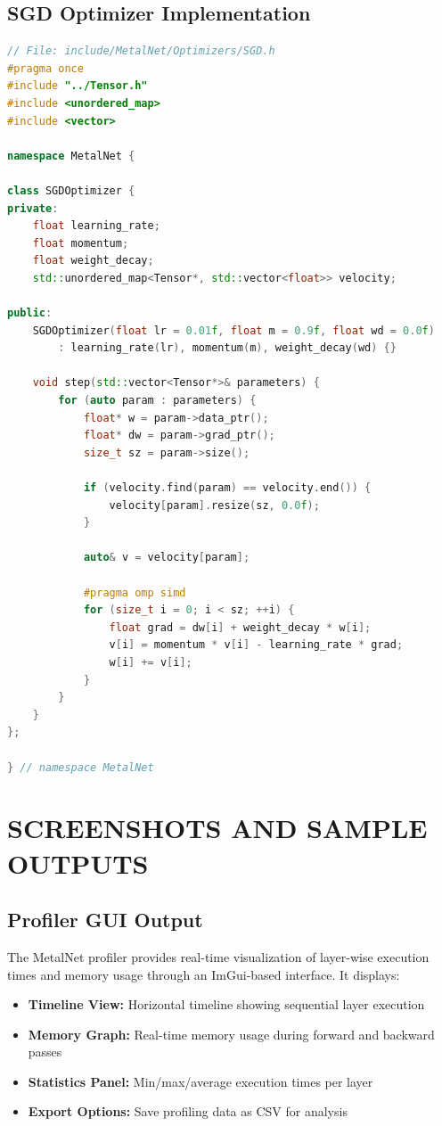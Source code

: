\documentclass[12pt,oneside,a4paper]{report}
\begin{document}
\section{SGD Optimizer Implementation}

\begin{lstlisting}[language=C++]
// File: include/MetalNet/Optimizers/SGD.h
#pragma once
#include "../Tensor.h"
#include <unordered_map>
#include <vector>

namespace MetalNet {

class SGDOptimizer {
private:
    float learning_rate;
    float momentum;
    float weight_decay;
    std::unordered_map<Tensor*, std::vector<float>> velocity;

public:
    SGDOptimizer(float lr = 0.01f, float m = 0.9f, float wd = 0.0f)
        : learning_rate(lr), momentum(m), weight_decay(wd) {}

    void step(std::vector<Tensor*>& parameters) {
        for (auto param : parameters) {
            float* w = param->data_ptr();
            float* dw = param->grad_ptr();
            size_t sz = param->size();

            if (velocity.find(param) == velocity.end()) {
                velocity[param].resize(sz, 0.0f);
            }

            auto& v = velocity[param];

            #pragma omp simd
            for (size_t i = 0; i < sz; ++i) {
                float grad = dw[i] + weight_decay * w[i];
                v[i] = momentum * v[i] - learning_rate * grad;
                w[i] += v[i];
            }
        }
    }
};

} // namespace MetalNet
\end{lstlisting}

\chapter{SCREENSHOTS AND SAMPLE OUTPUTS}

\section{Profiler GUI Output}

The MetalNet profiler provides real-time visualization of layer-wise execution times and memory usage through an ImGui-based interface. It displays:

\begin{itemize}
    \item \textbf{Timeline View:} Horizontal timeline showing sequential layer execution
    \item \textbf{Memory Graph:} Real-time memory usage during forward and backward passes
    \item \textbf{Statistics Panel:} Min/max/average execution times per layer
    \item \textbf{Export Options:} Save profiling data as CSV for analysis
\end{itemize}
\end{document}
